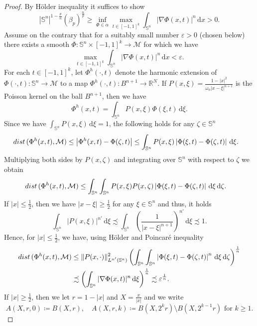 \documentclass[10pt,a4paper]{amsart}
\def\B{{B}}
\def\S{{\mathbb S}}
\def\dist{{\rm dist\,}}
\def\eps{\varepsilon}
\def\n{{\mathcal M}}
\newcommand{\R}{\mathbb{R}}
\newcommand{\abs}[1]{\left |#1 \right |}
\newcommand{\aleq}{\precsim}
\newcommand{\brac}[1]{\left (#1 \right )}
\newcommand{\dif}{\,\mathrm{d}}
\newcommand{\dx}{\dif x}
\begin{document}
\begin{proof}
By H\"older inequality it suffices to show
\[
 |\S^n|^{1-\frac{p}{n}} (\beta_p)^{\frac{n}{p}} \geq \inf_{\Phi \in \alpha} \max_{t \in [-1,1]^k} \int_{\S^n} |\nabla \Phi(x,t)|^n \dx > 0.
\]
Assume on the contrary that for a suitably small number $\eps > 0$ (chosen below) there exists a smooth $\Phi \colon \S^{n}\times[-1,1]^k \to \n$ for which we have
\begin{equation}\label{eq:smallness-contradiction}
 \max_{t \in [-1,1]^k} \int_{\S^n} |\nabla \Phi(x,t)|^n \dx < \eps.
\end{equation}
For each $t \in [-1,1]^k$, let $\Phi^h(\cdot,t)$ denote the harmonic extension of $\Phi(\cdot,t)\colon \S^n \to \n$  to a map $\Phi^h(\cdot,t)\colon \B^{n+1} \to \R^N$.
If $P(x,\xi) = \frac{1-|x|^2}{\omega_n |x-\xi|^{n+1}}$ is the Poisson kernel on the ball $B^{n+1}$, then we have 
\[
 \Phi^h(x,t) = \int_{\S^n} P(x,\xi) \Phi(\xi,t)\dif \xi.
\]
Since we have $\int_{\S^n}P(x,\xi)\dif \xi = 1$, the following holds for any $\zeta \in \S^n$
\[
\begin{split}
 \dist(\Phi^h(x,t),\n) &\le \abs{\Phi^h(x,t) - \Phi(\zeta,t)} \le \int_{\S^n} P(x,\xi) \abs{\Phi(\xi,t) - \Phi(\zeta,t)}\dif \xi.
\end{split}
 \]
Multiplying both sides by $P(x,\zeta)$ and integrating over $\S^n$ with respect to $\zeta$ we obtain
\begin{equation}\label{eq:distanceestimate}
 \begin{split}
  \dist(\Phi^h(x,t),\n) &\le \int_{\S^n}\int_{\S^n} P(x,\xi) P(x,\zeta) \abs{\Phi(\xi,t) - \Phi(\zeta,t)}\dif \xi \dif \zeta. 
 \end{split}
\end{equation}
If $|x|\le \frac12$, then we have $|x-\xi|\ge \frac12$ for any $\xi\in \S^n$ and thus, it holds
\[
 \int_{\S^n}|P(x,\xi)|^{n'}\dif \xi \aleq \int_{\S^n}\brac{\frac{1}{|x-\xi|^{n+1}}}^{n'} \dif \xi \aleq 1.
\]
Hence, for $|x|\le \frac12$, we have, using H\"{o}lder and Poincar\'{e} inequality
\[
\begin{split}
 \dist(\Phi^h(x,t),\n) 
 &\le \|P(x,\cdot)\|_{L^{n'}(\S^n)}^2 \brac{\int_{\S^n}\int_{\S^n} \abs{\Phi(\xi,t) - \Phi(\zeta,t)}^n\dif \xi \dif \zeta}^{\frac 1n}\\
 &\aleq \brac{\int_{\S^n}|\nabla \Phi(x,t)|^n \dif \xi}^{\frac 1n} \aleq \eps^{\frac 1n}.
\end{split}
 \]
If $|x|\ge \frac12$, then we let $r=1-|x|$ and $X=\frac{x}{|x|}$ and we write 
\[
A(X,r,0) \coloneqq B(X,r), \quad  A(X,r,k)\coloneqq B(X,2^{k}r)\setminus B(X,2^{k-1}r) \text{ for }k\ge 1.
\]
\end{proof}
\end{document}
